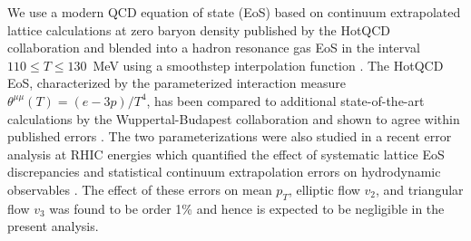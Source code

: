 \documentclass[aps,prc,reprint,amsmath,nofootinbib,superscriptaddress]{revtex4-1}
\begin{document}
We use a modern QCD equation of state (EoS) based on continuum extrapolated lattice calculations at zero baryon density published by the HotQCD collaboration \cite{Bazavov:2014pvz} and blended into a hadron resonance gas EoS in the interval $110 \le T \le 130$~MeV using a smoothstep interpolation function \cite{Moreland:2015dvc}.
The HotQCD EoS, characterized by the parameterized interaction measure $\theta^{\mu\mu}(T) = (e - 3p)/T^4$, has been compared to additional state-of-the-art calculations by the Wuppertal-Budapest collaboration and shown to agree within published errors \cite{Bazavov:2014pvz}.
The two parameterizations were also studied in a recent error analysis at RHIC energies which quantified the effect of systematic lattice EoS discrepancies and statistical continuum extrapolation errors on hydrodynamic observables \cite{Moreland:2015dvc}.
The effect of these errors on mean $p_T$, elliptic flow $v_2$, and triangular flow $v_3$ was found to be order 1\% and hence is expected to be negligible in the present analysis.
\end{document}
